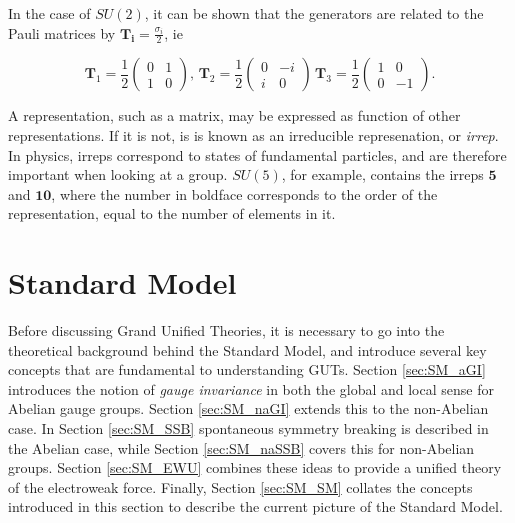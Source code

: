 \documentclass{article}
\begin{document}
In the case of $SU(2)$, it can be shown that the generators are related to the Pauli matrices by $\bm{T_i} = \frac{\sigma_i}{2}$, ie 

\begin{equation}
\label{eqn:SU2Gen}
\bm{T}_1 = \frac{1}{2}\left(\begin{matrix}
0 & 1 \\
1 & 0
\end{matrix}\right),\, \bm{T}_2 = \frac{1}{2} \left(
\begin{matrix}
0 & -i \\
i & 0
\end{matrix}\right)\,\bm{T}_3 = \frac{1}{2}\left(
\begin{matrix}
1 & 0 \\
0 & -1
\end{matrix}\right).
\end{equation}

A representation, such as a matrix, may be expressed as function of other representations. If it is not, is is known as an irreducible represenation, or \textit{irrep}. In physics, irreps correspond to states of fundamental particles, and are therefore important when looking at a group. $SU(5)$, for example, contains the irreps $\bm{5}$ and $\bm{10}$, where the number in boldface corresponds to the order of the representation, equal to the number of elements in it.

\section{Standard Model}%
\label{sec:SM}

Before discussing Grand Unified Theories, it is necessary to go into the theoretical background behind the Standard Model, and introduce several key concepts that are fundamental to understanding GUTs. Section \ref{sec:SM_aGI} introduces the notion of \textit{gauge invariance} in both the global and local sense for Abelian gauge groups. Section \ref{sec:SM_naGI} extends this to the non-Abelian case. In Section \ref{sec:SM_SSB} spontaneous symmetry breaking is described in the Abelian case, while Section \ref{sec:SM_naSSB} covers this for non-Abelian groups. Section \ref{sec:SM_EWU} combines these ideas to provide a unified theory of the electroweak force. Finally, Section \ref{sec:SM_SM} collates the concepts introduced in this section to describe the current picture of the Standard Model.
\end{document}
